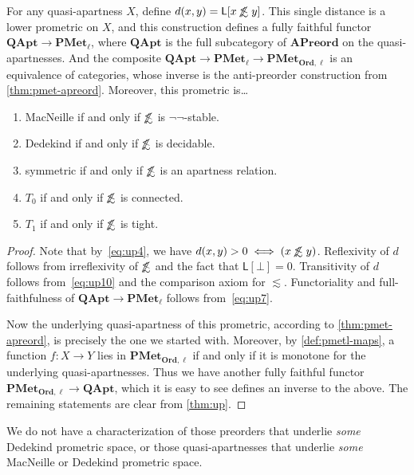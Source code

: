 \documentclass{article}
\def\L[#1]{\mathsf{L}[#1]}
\def\oapt{\mathrel{\!\not\,\not\lesssim}}
\def\leapx{\lesssim}
\def\nn{\ensuremath{\neg\neg}}
\def\Set{\mathbf{Set}}
\def\PMetl{\mathbf{PMet}_\ell}
\def\PMetOrdl{\mathbf{PMet}_{\mathbf{Ord},\ell}}
\def\APreord{\mathbf{APreord}}
\def\QApt{\mathbf{QApt}}
\begin{document}
\begin{thm}\label{thm:qapt-pmetl}
  For any quasi-apartness $X$, define $d(x,y) = \L[x\oapt y]$.
  This single distance is a lower prometric on $X$, and this construction defines a fully faithful functor $\QApt \to \PMetl$, where $\QApt$ is the full subcategory of $\APreord$ on the quasi-apartnesses.
  And the composite $\QApt \to \PMetl \to \PMetOrdl$ is an equivalence of categories, whose inverse is the anti-preorder construction from \cref{thm:pmet-apreord}.
  Moreover, this prometric is\dots
  \begin{enumerate}
  \item MacNeille if and only if $\oapt$ is \nn-stable.
  \item Dedekind if and only if $\oapt$ is decidable.
  \item symmetric if and only if $\oapt$ is an apartness relation.
  \item $T_0$ if and only if $\oapt$ is connected.
  \item $T_1$ if and only if $\oapt$ is tight.
  \end{enumerate}
\end{thm}
\begin{proof}
  Note that by~\eqref{eq:up4}, we have $d(x,y)>0 \iff (x\oapt y)$.
  Reflexivity of $d$ follows from irreflexivity of $\oapt$ and the fact that $\L[\bot]=0$.
  Transitivity of $d$ follows from~\eqref{eq:up10} and the comparison axiom for $\leapx$.
  Functoriality and full-faithfulness of $\QApt \to \PMetl$ follows from~\eqref{eq:up7}.
  
  Now the underlying quasi-apartness of this prometric, according to \cref{thm:pmet-apreord}, is precisely the one we started with.
  Moreover, by \cref{def:pmetl-maps}, a function $f:X\to Y$ lies in $\PMetOrdl$ if and only if it is monotone for the underlying quasi-apartnesses.
  Thus we have another fully faithful functor $\PMetOrdl \to \QApt$, which it is easy to see defines an inverse to the above.
  The remaining statements are clear from \cref{thm:up}.
\end{proof}

We do not have a characterization of those preorders that underlie \emph{some} Dedekind prometric space, or those quasi-apartnesses that underlie \emph{some} MacNeille or Dedekind prometric space.

\end{document}
